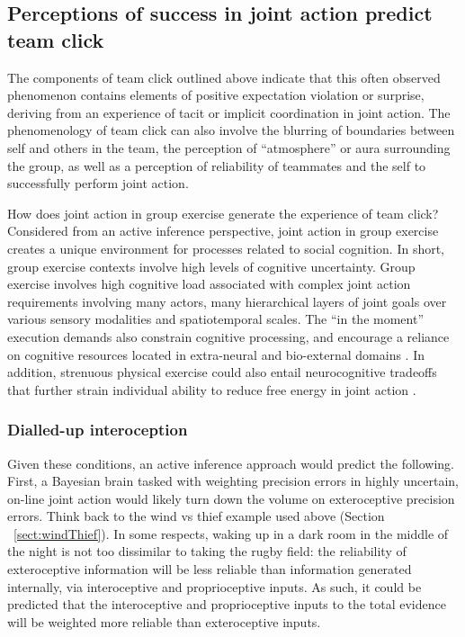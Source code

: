\begin{CJK}{UTF8}{gbsn}
\subsection{Perceptions of success in joint action predict team click\label{sect:JASuccessTeamClick}}

The components of team click outlined above indicate that this often observed phenomenon contains elements of positive expectation violation or surprise, deriving from an experience of tacit or implicit coordination in joint action.  The phenomenology of team click can also involve the blurring of boundaries between self and others in the team, the perception of ``atmosphere'' or aura surrounding the group, as well as a perception of reliability of teammates and the self to successfully perform joint action.

How does joint action in group exercise generate the experience of team click?  Considered from an active inference perspective, joint action in group exercise creates a unique environment for processes related to social cognition. In short, group exercise contexts involve high levels of cognitive uncertainty.  Group exercise involves high cognitive load associated with complex joint action requirements involving many actors, many hierarchical layers of joint goals over various sensory modalities and spatiotemporal scales. The ``in the moment'' execution demands also constrain cognitive processing, and encourage a reliance on cognitive resources located in extra-neural and bio-external domains \citep{Bourbousson2016}.  In addition, strenuous physical exercise could also entail neurocognitive tradeoffs that further strain individual ability to reduce free energy in joint action \citep{Dietrich2004b}.

\subsubsection{Dialled-up interoception}
Given these conditions, an active inference approach would predict the following.  First, a Bayesian brain tasked with weighting precision errors in highly uncertain, on-line joint action would likely turn down the volume on exteroceptive precision errors.  Think back to the wind vs thief example used above (Section ~\ref{sect:windThief}). In some respects, waking up in a dark room in the middle of the night is not too dissimilar to taking the rugby field: the reliability of exteroceptive information will be less reliable than information generated internally, via interoceptive and proprioceptive inputs. As such, it could be predicted that the interoceptive and proprioceptive inputs to the total evidence will be weighted more reliable than exteroceptive inputs.


\end{CJK}
